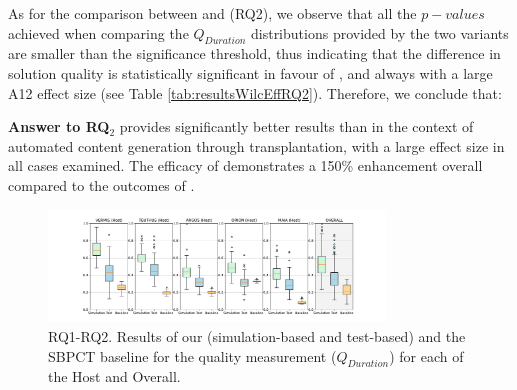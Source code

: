 As for the comparison between \simhotep{} and \timhotep{} (RQ2),  we observe that all the $p-values$ achieved when comparing the $Q_{Duration}$ distributions provided by the two \ApproachName{} variants are smaller than the significance threshold, thus indicating that the difference in solution quality is statistically significant in favour of \simhotep{}, and always with a large A12 effect size (see Table \ref{tab:resultsWilcEffRQ2}). Therefore, we conclude that:

\noindent  \textbf{Answer to RQ$_2$} \simhotep{} provides significantly better results than \timhotep{} in the context of automated content generation through transplantation, with a large effect size in all cases examined. The efficacy of \simhotep{} demonstrates a 150\% enhancement overall compared to the outcomes of \timhotep{}.

\begin{figure}[tb]
    \centering
    \includegraphics[width=0.8\textwidth]{Figures/Imhotep_with_legend_and_oracle_average-v4.pdf}
    \caption{RQ1-RQ2. Results of our \ApproachName{} (simulation-based and test-based) and the SBPCT baseline for the quality measurement ($Q_{Duration}$) for each of the \CaseStudy{} Host and Overall.}
    \label{fig:results}
\end{figure}